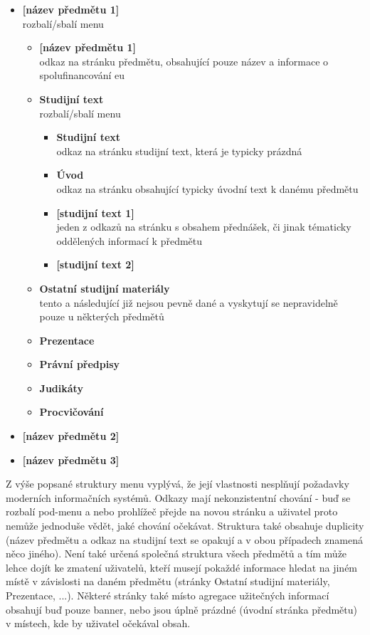 \begin{itemize}
  \item \textbf{[název předmětu 1]} \hfill \\
    rozbalí/sbalí menu
  \begin{itemize}
    \item \textbf{[název předmětu 1]} \hfill \\
      odkaz na stránku předmětu, obsahující pouze název a informace o spolufinancování \gls{eu}
    \item \textbf{Studijní text} \hfill \\
      rozbalí/sbalí menu
      \begin{itemize}
        \item \textbf{Studijní text} \hfill \\
          odkaz na stránku studijní text, která je typicky prázdná
        \item \textbf{Úvod} \hfill \\
          odkaz na stránku obsahující typicky úvodní text k danému předmětu
        \item \textbf{[studijní text 1]} \hfill \\
          jeden z odkazů na stránku s obsahem přednášek, či jinak tématicky oddělených informací k předmětu
        \item \textbf{[studijní text 2]}
      \end{itemize}
    \item \textbf{Ostatní studijní materiály} \hfill \\
      tento a následující již nejsou pevně dané a vyskytují se nepravidelně pouze u některých předmětů
    \item \textbf{Prezentace}
    \item \textbf{Právní předpisy}            
    \item \textbf{Judikáty}
    \item \textbf{Procvičování}        
  \end{itemize}
  \item \textbf{[název předmětu 2]}
  \item \textbf{[název předmětu 3]}
\end{itemize}

Z výše popsané struktury menu vyplývá, že její vlastnosti nesplňují požadavky moderních informačních systémů. Odkazy mají nekonzistentní chování - buď se rozbalí pod-menu a nebo prohlížeč přejde na novou stránku a uživatel proto nemůže jednoduše vědět, jaké chování očekávat. Struktura také obsahuje duplicity (název předmětu a odkaz na studijní text se opakují a v obou případech znamená něco jiného). Není také určená společná struktura všech předmětů a tím může lehce dojít ke zmatení uživatelů, kteří musejí pokaždé informace hledat na jiném místě v závislosti na daném předmětu (stránky Ostatní studijní materiály, Prezentace, ...). Některé stránky také místo agregace užitečných informací obsahují buď pouze banner, nebo jsou úplně prázdné (úvodní stránka předmětu) v místech, kde by uživatel očekával obsah.

